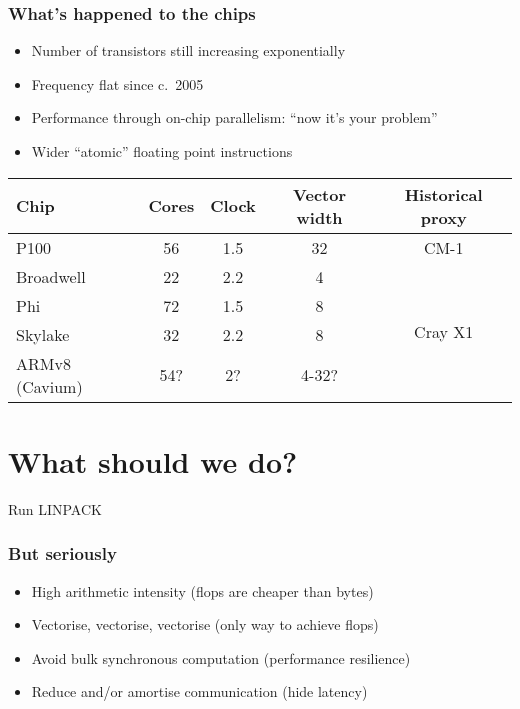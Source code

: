 \documentclass[presentation]{beamer}
\begin{document}
\begin{frame}
  \frametitle{What's happened to the chips}
  \begin{itemize}
  \item Number of transistors still increasing exponentially
  \item Frequency flat since c.~2005
  \item Performance through on-chip parallelism: ``now it's your
    problem''
  \item Wider ``atomic'' floating point instructions
  \end{itemize}

  \begin{tabular}{lcccc}
    Chip           & Cores & Clock & Vector width & Historical proxy         \\
    \hline
    P100           & 56    & 1.5   & 32           & CM-1                     \\
    Broadwell      & 22    & 2.2   & 4            & \multirow{4}{*}{Cray X1} \\
    Phi            & 72    & 1.5   & 8            &                          \\
    Skylake        & 32    & 2.2   & 8            &                          \\
    ARMv8 (Cavium) & 54?   & 2?    & 4-32?        &                          \\
  \end{tabular}
\end{frame}

\section{What should we do?}

\begin{frame}[standout]
 Run LINPACK
\end{frame}

\begin{frame}
  \frametitle{But seriously}
  \begin{itemize}
  \item High arithmetic intensity (flops are cheaper than bytes)
  \item Vectorise, vectorise, vectorise (only way to achieve flops)
  \item Avoid bulk synchronous computation (performance resilience)
  \item Reduce and/or amortise communication (hide latency)
  \end{itemize}
\end{frame}
\end{document}
